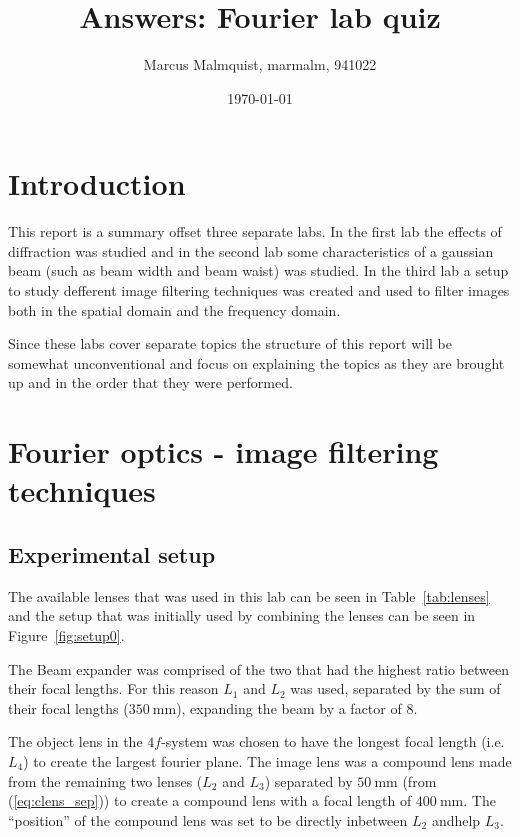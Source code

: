 \documentclass[12pt,a4paper]{article}
\title{Answers: Fourier lab quiz}
\author{Marcus Malmquist, marmalm, 941022}
\date{\today}
\begin{document}
\maketitle

\section{Introduction}
This report is a summary offset three separate labs. In the first lab the effects of diffraction was studied and in the second lab some characteristics of a gaussian beam (such as beam width and beam waist) was studied. In the third lab a setup to study defferent image filtering techniques was created and used to filter images both in the spatial domain and the frequency domain.

Since these labs cover separate topics the structure of this report will be somewhat unconventional and focus on explaining the topics as they are brought up and in the order that they were performed.

\section{Fourier optics - image filtering techniques}
\subsection{Experimental setup}\label{sec:setup}
The available lenses that was used in this lab can be seen in Table~\ref{tab:lenses} and the setup that was initially used by combining the lenses can be seen in Figure~\ref{fig:setup0}.

The Beam expander was comprised of the two that had the highest ratio between their focal lengths. For this reason $L_1$ and $L_2$ was used, separated by the sum of their focal lengths ($\SI{350}{\milli\metre}$), expanding the beam by a factor of 8.

The object lens in the $4f$-system was chosen to have the longest focal length (i.e. $L_4$) to create the largest fourier plane. The image lens was a compound lens made from the remaining two lenses ($L_2$ and $L_3$) separated by $\SI{50}{\milli\metre}$ (from (\ref{eq:clens_sep})) to create a compound lens with a focal length of $\SI{400}{\milli\metre}$. The ``position'' of the compound lens was set to be directly inbetween $L_2$ andhelp $L_3$.
\end{document}
